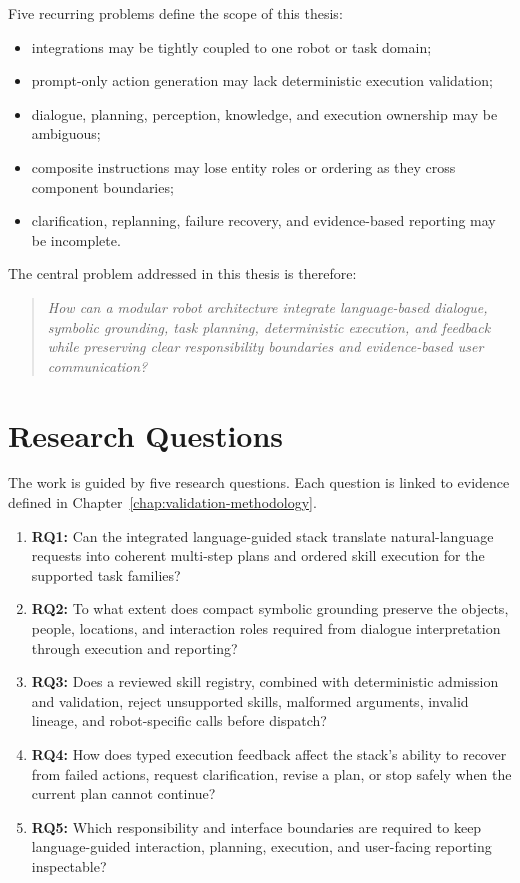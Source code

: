 Five recurring problems define the scope of this thesis:

\begin{itemize}
  \item integrations may be tightly coupled to one robot or task domain;
  \item prompt-only action generation may lack deterministic execution validation;
  \item dialogue, planning, perception, knowledge, and execution ownership may be ambiguous;
  \item composite instructions may lose entity roles or ordering as they cross component boundaries;
  \item clarification, replanning, failure recovery, and evidence-based reporting may be incomplete.
\end{itemize}

The central problem addressed in this thesis is therefore:

\begin{quote}
\textit{How can a modular robot architecture integrate language-based dialogue, symbolic grounding, task planning, deterministic execution, and feedback while preserving clear responsibility boundaries and evidence-based user communication?}
\end{quote}

\section{Research Questions}

The work is guided by five research questions. Each question is linked to evidence defined in Chapter~\ref{chap:validation-methodology}.

\begin{enumerate}
  \item \textbf{RQ1:} Can the integrated language-guided stack translate natural-language requests into coherent multi-step plans and ordered skill execution for the supported task families?

  \item \textbf{RQ2:} To what extent does compact symbolic grounding preserve the objects, people, locations, and interaction roles required from dialogue interpretation through execution and reporting?

  \item \textbf{RQ3:} Does a reviewed skill registry, combined with deterministic admission and validation, reject unsupported skills, malformed arguments, invalid lineage, and robot-specific calls before dispatch?

  \item \textbf{RQ4:} How does typed execution feedback affect the stack's ability to recover from failed actions, request clarification, revise a plan, or stop safely when the current plan cannot continue?

  \item \textbf{RQ5:} Which responsibility and interface boundaries are required to keep language-guided interaction, planning, execution, and user-facing reporting inspectable?
\end{enumerate}

